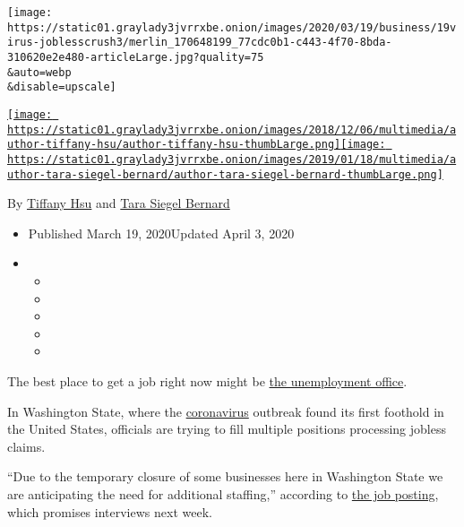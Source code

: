 \texttt{[image: https://static01.graylady3jvrrxbe.onion/images/2020/03/19/business/19virus-joblesscrush3/merlin\_170648199\_77cdc0b1-c443-4f70-8bda-310620e2e480-articleLarge.jpg?quality=75\\\&auto=webp\\\&disable=upscale]}

\href{https://www.nytimes3xbfgragh.onion/by/tiffany-hsu}{\texttt{[image: https://static01.graylady3jvrrxbe.onion/images/2018/12/06/multimedia/author-tiffany-hsu/author-tiffany-hsu-thumbLarge.png]}}\href{https://www.nytimes3xbfgragh.onion/by/tara-siegel-bernard}{\texttt{[image: https://static01.graylady3jvrrxbe.onion/images/2019/01/18/multimedia/author-tara-siegel-bernard/author-tara-siegel-bernard-thumbLarge.png]}}

By \href{https://www.nytimes3xbfgragh.onion/by/tiffany-hsu}{Tiffany Hsu}
and
\href{https://www.nytimes3xbfgragh.onion/by/tara-siegel-bernard}{Tara
Siegel Bernard}

\begin{itemize}
\item
  Published March 19, 2020Updated April 3, 2020
\item
  \begin{itemize}
  \item
  \item
  \item
  \item
  \item
  \end{itemize}
\end{itemize}

The best place to get a job right now might be
\href{https://www.nytimes3xbfgragh.onion/interactive/2020/03/19/upshot/coronavirus-jobless-claims-states.html}{the
unemployment office}.

In Washington State, where the
\href{https://www.nytimes3xbfgragh.onion/2020/04/03/upshot/coronavirus-jobless-rate-great-depression.html}{coronavirus}
outbreak found its first foothold in the United States, officials are
trying to fill multiple positions processing jobless claims.

``Due to the temporary closure of some businesses here in Washington
State we are anticipating the need for additional staffing,'' according
to
\href{https://www.linkedin.com/jobs/view/1784435892/?eBP=NotAvailableFromVoyagerAPI\&refId=5127803b-7fa9-4b25-b20c-df682ddc6057\&trk=d_flagship3_search_srp_jobs}{the
job posting}, which promises interviews next week.

